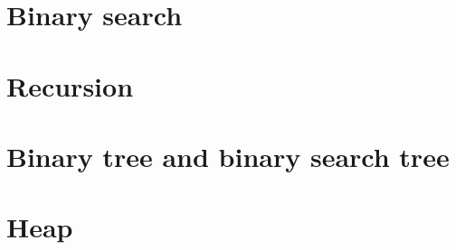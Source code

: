\documentclass[openany]{book}
\begin{document}
\chapter{Binary search}


\chapter{Recursion}


\chapter{Binary tree and binary search tree}


\chapter{Heap} 


\end{document}
